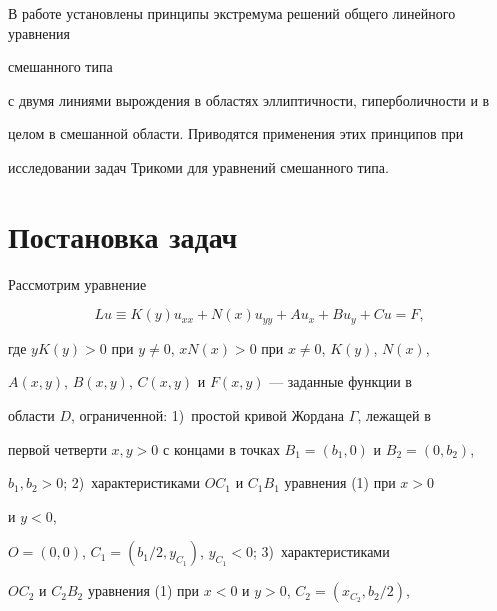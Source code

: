 \pagestyle{plain} %







\maketitle


\label{begin}





В работе установлены принципы экстремума решений общего линейного уравнения


смешанного типа


с двумя линиями вырождения в областях эллиптичности, гиперболичности и в 


целом в смешанной области. Приводятся применения этих принципов при 


исследовании задач Трикоми для уравнений смешанного типа.





\section{Постановка задач}





Рассмотрим уравнение 


\begin{equation}


Lu\equiv K(y)u_{xx}+N(x)u_{yy}+Au_x+Bu_y+Cu=F,


\end{equation}


где $yK(y)>0$ при $y\ne 0$, $xN(x)>0$ при $x\ne 0$, $K(y)$, $N(x)$,


$A(x,y)$, $B(x,y)$, $C(x,y)$ и $F(x,y)$ --- заданные функции в 


области $D$, ограниченной: 1)~простой кривой Жордана $\Gamma$, лежащей в


первой четверти $x,y>0$ с концами в точках $B_1=(b_1,0)$ и $B_2=(0,b_2)$,


$b_1,b_2>0$; 2)~характеристиками $OC_1$ и $C_1B_1$ уравнения (1) при $x>0$


и $y<0$,


$O=(0,0)$, $C_1=(b_1/2, y_{C_1})$, $y_{C_1}<0$; 3)~характеристиками 


$OC_2$ и $C_2B_2$ уравнения (1) при $x<0$ и $y>0$, $C_2=(x_{C_2}, b_2/2)$, 


